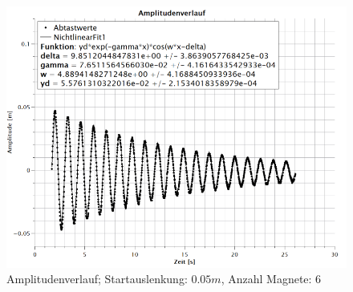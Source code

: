 \newpage
\begin{figure}[h]
\centering
\includegraphics[scale=1.2]{Bilder/amplitudenverlauf_005_6.png} 
\caption{Amplitudenverlauf; Startauslenkung: $0.05m$, Anzahl Magnete: 6}
\label{fig:amplitudenverlauf_005_6}
\end{figure}
\newpage